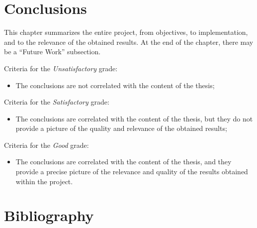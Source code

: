 \documentclass[12pt,a4paper]{report}
\begin{document}
\chapter{Conclusions}
This chapter summarizes the entire project, from objectives, to implementation, and to the relevance of the obtained results. At the end of the chapter, there may be a ``Future Work'' subsection.

Criteria for the \textit{Un\textit{satisfactory}} grade:
\begin{itemize}
	\item	The conclusions are not correlated with the content of the thesis;
\end{itemize}

Criteria for the \textit{Satisfactory} grade:
\begin{itemize}
	\item	The conclusions are correlated with the content of the thesis, but they do not provide a picture of the quality and relevance of the obtained results;
\end{itemize}

Criteria for the \textit{Good} grade:
\begin{itemize}
	\item	The conclusions are correlated with the content of the thesis, and they provide a precise picture of the relevance and quality of the results obtained within the project.
\end{itemize}

\chapter*{Bibliography}
%
%
\end{document}
